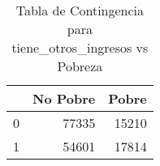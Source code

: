 \begin{table}[ht]
\centering
\begin{tabular}{rrr}
  \toprule
 & No Pobre & Pobre \\ 
  \midrule
0 & 77335 & 15210 \\ 
  1 & 54601 & 17814 \\ 
   \bottomrule
\end{tabular}
\caption{Tabla de Contingencia para tiene_otros_ingresos vs Pobreza} 
\label{tab:contingency_tiene_otros_ingresos}
\end{table}
